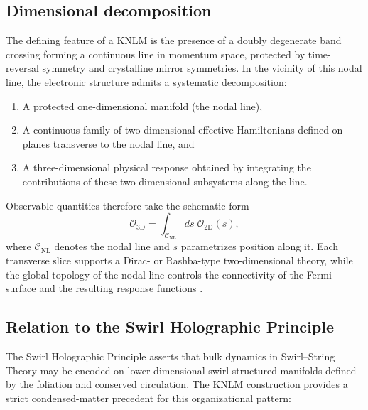 \documentclass[11pt]{article}
\begin{document}
    \subsection{Dimensional decomposition}

        The defining feature of a KNLM is the presence of a doubly degenerate band
        crossing forming a continuous line in momentum space, protected by
        time-reversal symmetry and crystalline mirror symmetries.
        In the vicinity of this nodal line, the electronic structure admits a
        systematic decomposition:

        \begin{enumerate}
            \item A protected one-dimensional manifold (the nodal line),
            \item A continuous family of two-dimensional effective Hamiltonians
            defined on planes transverse to the nodal line, and
            \item A three-dimensional physical response obtained by integrating the
            contributions of these two-dimensional subsystems along the line.
        \end{enumerate}

        Observable quantities therefore take the schematic form
        \begin{equation}
            \mathcal{O}_{\mathrm{3D}}
            =
            \int_{\mathcal{C}_{\mathrm{NL}}} ds \;
            \mathcal{O}_{\mathrm{2D}}(s),
        \end{equation}
        where $\mathcal{C}_{\mathrm{NL}}$ denotes the nodal line and $s$ parametrizes
        position along it.
        Each transverse slice supports a Dirac- or Rashba-type two-dimensional theory,
        while the global topology of the nodal line controls the connectivity of the
        Fermi surface and the resulting response functions
        \cite{Domaine2025NatCommOctdong,Armitage2018WeylDiracRMP}.

    \subsection{Relation to the Swirl Holographic Principle}

        The Swirl Holographic Principle asserts that bulk dynamics in
        Swirl--String Theory may be encoded on lower-dimensional swirl-structured
        manifolds defined by the foliation and conserved circulation.
        The KNLM construction provides a strict condensed-matter precedent for this
        organizational pattern:
\end{document}
